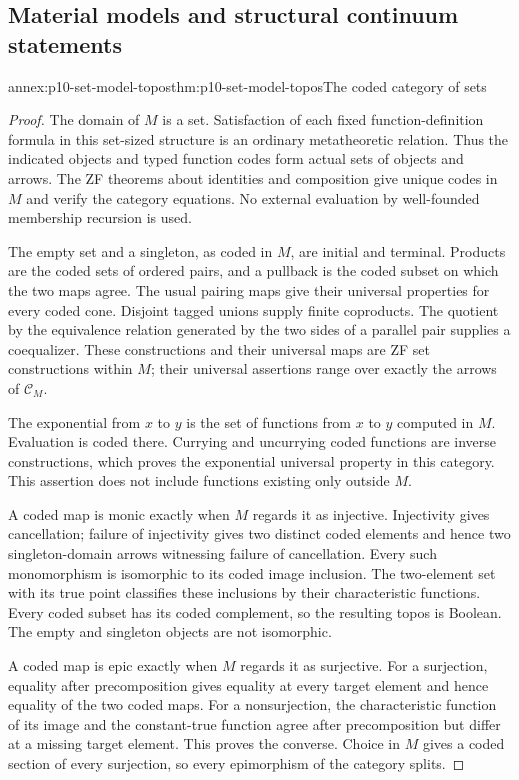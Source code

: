 \subsection{Material models and structural continuum statements}
\label{sec:annex-p10-set-models-structural-ch}

\begin{annexitem}{annex:p10-set-model-topos}{thm:p10-set-model-topos}{The coded category of sets}
\begin{proof}
The domain of \(M\) is a set.
Satisfaction of each fixed function-definition formula in this
set-sized structure is an ordinary metatheoretic relation.
Thus the indicated objects and typed function codes form actual
sets of objects and arrows.
The ZF theorems about identities and composition give unique
codes in \(M\) and verify the category equations.
No external evaluation by well-founded membership recursion is used.

The empty set and a singleton, as coded in \(M\), are initial
and terminal. Products are the coded sets of ordered pairs,
and a pullback is the coded subset on which the two maps agree.
The usual pairing maps give their universal properties for
every coded cone.
Disjoint tagged unions supply finite coproducts.
The quotient by the equivalence relation generated by the
two sides of a parallel pair supplies a coequalizer.
These constructions and their universal maps are ZF
set constructions within \(M\); their universal assertions
range over exactly the arrows of \(\mathcal C_M\).

The exponential from \(x\) to \(y\) is the set of functions
from \(x\) to \(y\) computed in \(M\).
Evaluation is coded there.
Currying and uncurrying coded functions are inverse constructions,
which proves the exponential universal property in this category.
This assertion does not include functions existing only outside \(M\).

A coded map is monic exactly when \(M\) regards it as injective.
Injectivity gives cancellation; failure of injectivity gives
two distinct coded elements and hence two singleton-domain
arrows witnessing failure of cancellation.
Every such monomorphism is isomorphic to its coded image inclusion.
The two-element set with its true point classifies these
inclusions by their characteristic functions.
Every coded subset has its coded complement, so the resulting
topos is Boolean.
The empty and singleton objects are not isomorphic.

A coded map is epic exactly when \(M\) regards it as surjective.
For a surjection, equality after precomposition gives equality
at every target element and hence equality of the two coded maps.
For a nonsurjection, the characteristic function of its image
and the constant-true function agree after precomposition
but differ at a missing target element.
This proves the converse.
Choice in \(M\) gives a coded section of every surjection,
so every epimorphism of the category splits.


\end{proof}
\end{annexitem}
